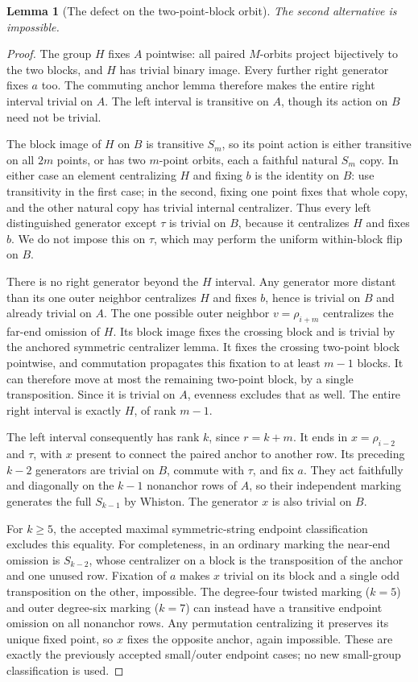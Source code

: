 \documentclass[11pt,a4paper]{article}
\newtheorem{lemma}{Lemma}
\begin{document}
\begin{lemma}[The defect on the two-point-block orbit]
The second alternative is impossible.
\end{lemma}
\begin{proof}
The group $H$ fixes $A$ pointwise: all paired $M$-orbits
project bijectively to the two blocks, and $H$ has trivial
binary image. Every further right generator fixes $a$ too.
The commuting anchor lemma therefore makes the entire right
interval trivial on $A$. The left interval is transitive on
$A$, though its action on $B$ need not be trivial.

The block image of $H$ on $B$ is transitive $S_m$, so its
point action is either transitive on all $2m$ points, or
has two $m$-point orbits, each a faithful natural $S_m$
copy. In either case an element centralizing $H$ and fixing
$b$ is the identity on $B$: use transitivity in the first
case; in the second, fixing one point fixes that whole copy,
and the other natural copy has trivial internal centralizer.
Thus every left distinguished generator except $\tau$ is
trivial on $B$, because it centralizes $H$ and fixes $b$.
We do not impose this on $\tau$, which may perform the
uniform within-block flip on $B$.

There is no right generator beyond the $H$ interval.
Any generator more distant than its one outer neighbor
centralizes $H$ and fixes $b$, hence is trivial on $B$
and already trivial on $A$. The one possible outer neighbor
$v=\rho_{i+m}$ centralizes the far-end omission of $H$.
Its block image fixes the crossing block and is trivial by
the anchored symmetric centralizer lemma. It fixes the
crossing two-point block pointwise, and commutation propagates
this fixation to at least $m-1$ blocks. It can therefore
move at most the remaining two-point block, by a single
transposition. Since it is trivial on $A$, evenness excludes
that as well. The entire right interval is exactly $H$,
of rank $m-1$.

The left interval consequently has rank $k$, since
$r=k+m$. It ends in $x=\rho_{i-2}$ and $\tau$, with $x$
present to connect the paired anchor to another row.
Its preceding $k-2$ generators are trivial on $B$, commute
with $\tau$, and fix $a$. They act faithfully and diagonally
on the $k-1$ nonanchor rows of $A$, so their independent
marking generates the full $S_{k-1}$ by Whiston.
The generator $x$ is also trivial on $B$.

For $k\geq5$, the accepted maximal symmetric-string endpoint
classification excludes this equality. For completeness, in
an ordinary marking the near-end omission is $S_{k-2}$,
whose centralizer on a block is the transposition of the
anchor and one unused row. Fixation of $a$ makes $x$
trivial on its block and a single odd transposition on the
other, impossible. The degree-four twisted marking
($k=5$) and outer degree-six marking ($k=7$) can instead
have a transitive endpoint omission on all nonanchor rows.
Any permutation centralizing it preserves its unique fixed
point, so $x$ fixes the opposite anchor, again impossible.
These are exactly the previously accepted small/outer
endpoint cases; no new small-group classification is used.


\end{proof}
\end{document}

